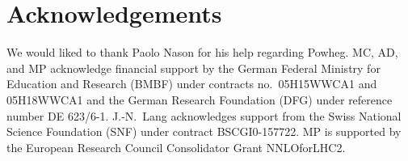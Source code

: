 \documentclass[paper]{JHEP3}
\begin{document}
\section*{Acknowledgements}

We would liked to thank Paolo Nason for his help regarding {\sc Powheg}.
MC, AD, and MP acknowledge financial support by the
German Federal Ministry for Education and Research (BMBF) under
contracts no.~05H15WWCA1 and 05H18WWCA1 and the German Research Foundation (DFG) under
reference number DE 623/6-1.
J.-N.~Lang acknowledges support from the Swiss National Science Foundation (SNF)
under contract BSCGI0-157722.
MP is supported by the European Research Council Consolidator Grant NNLOforLHC2.


%

\end{document}
